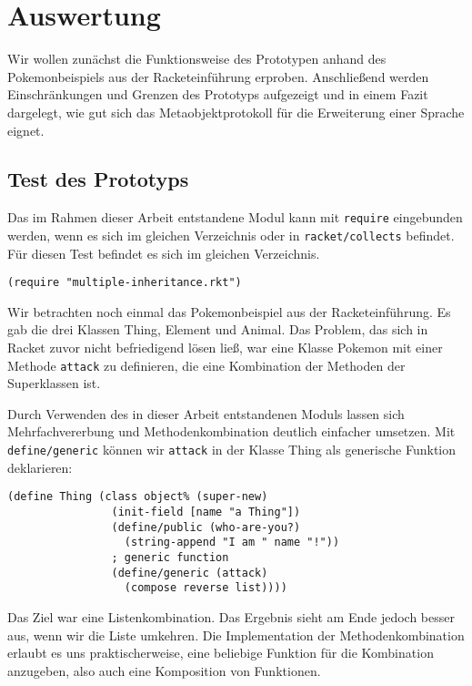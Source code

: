 \chapter{Auswertung}
Wir wollen zunächst die Funktionsweise des Prototypen anhand des Pokemonbeispiels aus der Racketeinführung erproben. Anschließend werden Einschränkungen und Grenzen des Prototyps aufgezeigt und in einem Fazit dargelegt, wie gut sich das Metaobjektprotokoll für die Erweiterung einer Sprache eignet.

\section{Test des Prototyps}
Das im Rahmen dieser Arbeit entstandene Modul kann mit \texttt{require} eingebunden werden, wenn es sich im gleichen Verzeichnis oder in \texttt{racket/collects} befindet. Für diesen Test befindet es sich im gleichen Verzeichnis.

\begin{lstlisting}
(require "multiple-inheritance.rkt")
\end{lstlisting}

Wir betrachten noch einmal das Pokemonbeispiel aus der Racketeinführung. Es gab die drei Klassen Thing, Element und Animal. Das Problem, das sich in Racket zuvor nicht befriedigend lösen ließ, war eine Klasse Pokemon mit einer Methode \texttt{attack} zu definieren, die eine Kombination der Methoden der Superklassen ist. 

Durch Verwenden des in dieser Arbeit entstandenen Moduls lassen sich Mehrfachvererbung und Methodenkombination deutlich einfacher umsetzen. Mit \texttt{define/generic} können wir \texttt{attack} in der Klasse Thing als generische Funktion deklarieren:

\begin{lstlisting}
(define Thing (class object% (super-new)
                (init-field [name "a Thing"])
                (define/public (who-are-you?)
                  (string-append "I am " name "!"))
                ; generic function
                (define/generic (attack)
                  (compose reverse list))))
\end{lstlisting}

Das Ziel war eine Listenkombination. Das Ergebnis sieht am Ende jedoch besser aus, wenn wir die Liste umkehren. Die Implementation der Methodenkombination erlaubt es uns praktischerweise, eine beliebige Funktion für die Kombination anzugeben, also auch eine Komposition von Funktionen.

